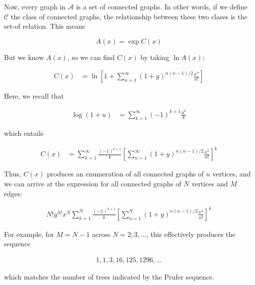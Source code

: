 \documentclass[a4paper, 12pt]{article}
\begin{document}
Now, every graph in $\mathcal{A}$ is a set of connected graphs. In other words,
if we define $\mathcal{C}$ the class of connected graphs, the relationship
between these two clases is the set-of relation. This means 

\begin{equation*}
    A(x) = \exp C(x)
\end{equation*}

But we know $A(x)$, so we can find $C(x)$ by taking $\ln A(x)$:

\begin{align*}
    C(x) &= \ln \left[1 + \sum_{n=1}^{\infty} (1+y)^{n(n-1)/2} \frac{x^n}{n!}\right]
\end{align*}

Here, we recall that 

\begin{align*}
    \log (1 + u) &= \sum_{k=1}^{\infty} (-1)^{k+1} \frac{u^k}{k}
\end{align*}

which entails 

\begin{align*}
    C(x) &= \sum_{k=1}^{\infty} \frac{ (-1)^{k+1} }{k} \left[ \sum_{n=1}^{\infty}\left( 1+y \right)^{n (n-1) / 2} \frac{x^n}{n!}  \right]^{k} 
\end{align*}

Thus, $C(x)$ produces an enumeration of all connected graphs of $n$ vertices, and we can arrive at the expression for all connected graphs of $N$ vertices and $M$ edges:

\begin{align*}
    N! y^M x^N \sum_{k=1}^{N} \frac{ (-1)^{k+1} }{k} \left[ \sum_{n=1}^{N}\left( 1+y \right)^{n (n-1) / 2} \frac{x^n}{n!}  \right]^{k} 
\end{align*}

For example, for $M = N - 1$ across $N = 2, 3, \ldots$, this effectively produces the sequence 

\begin{align*}
    1, 1, 3, 16, 125, 1296, \ldots
\end{align*}

which matches the number of trees indicated by the Prufer sequence.
\end{document}
